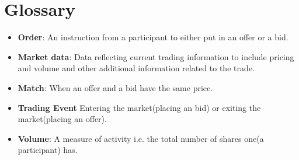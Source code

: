 \documentclass[12pt]{article}
\begin{document}
	\section{Glossary}	
		\begin{itemize}
			\item \textbf{Order}: An instruction from a participant to either put in an offer or a bid.
			\item \textbf{Market data}: Data reflecting current trading information to include pricing and volume and other additional information related to the trade.
			\item \textbf{Match}: When an offer and a bid have the same price.
			\item \textbf{Trading Event} Entering the market(placing an bid) or exiting the market(placing an offer). 
			\item \textbf{Volume}: A measure of activity i.e. the total number of shares one(a participant) has. 
		\end{itemize}				    			    			    		
\end{document}
